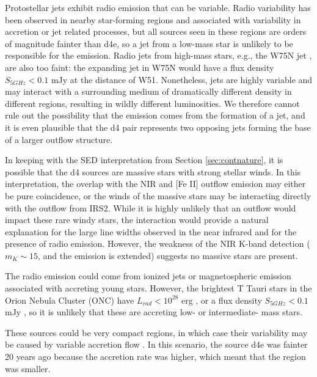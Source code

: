 Protostellar jets exhibit radio emission that can be variable.  Radio
variability has been observed in nearby star-forming regions
\citep{Liu2014c,Forbrich2013a} and associated with variability in accretion or
jet related processes, but all sources seen in these regions are orders of
magnitude fainter than d4e, so a jet from a low-mass star is unlikely to be
responsible for the emission.  Radio jets from high-mass stars, e.g., the W75N
jet \citep{Carrasco-Gonzalez2015a}, are also too faint: the expanding jet in
W75N would have a flux density $S_{5 GHz} < 0.1$ mJy at the distance of W51.
Nonetheless, jets are highly variable and may interact with a surrounding
medium of dramatically different density in different regions, resulting in
wildly different luminosities.  We therefore cannot rule out the possibility
that the emission comes from the formation of a jet, and it is even plausible
that the d4 pair represents two opposing jets forming the base of a larger
outflow structure.

In keeping with the SED interpretation from Section \ref{sec:contnature}, it is
possible that the d4 sources are massive stars with strong stellar winds.  In
this interpretation, the overlap with the NIR \hh and [Fe II] outflow emission
\citep[Figure \ref{fig:d4h2}][]{Hodapp2002a} may either be pure
coincidence, or the winds of the massive stars may be interacting directly with
the outflow from IRS2.  While it is highly unlikely that an outflow would
impact these rare windy stars, the interaction would provide a natural
explanation for the large line widths observed in the near infrared and for the
presence of radio emission.  However, the weakness of the NIR K-band detection
($m_K \sim 15$, and the emission is extended) suggests no massive stars are
present.

The radio emission could come from ionized jets or magnetospheric emission
associated with accreting young stars.  However, the brightest T Tauri stars in the
Orion Nebula Cluster (ONC) have $L_{rad}<10^{28}$ erg \pers, or a flux density
$S_{5 GHz} < 0.1$ mJy \citep{Forbrich2013a,Zapata2004a}, so it is unlikely that
these are accreting low- or intermediate- mass stars.  

These sources could be very compact \hchii regions, in which case their
variability may be caused by variable accretion flow
\citep{Peters2010c,Galvan-Madrid2011d,de-Pree2014a}.  In this scenario, the
source d4e was fainter 20 years ago because the accretion rate was higher,
which meant that the \hchii region was smaller.

